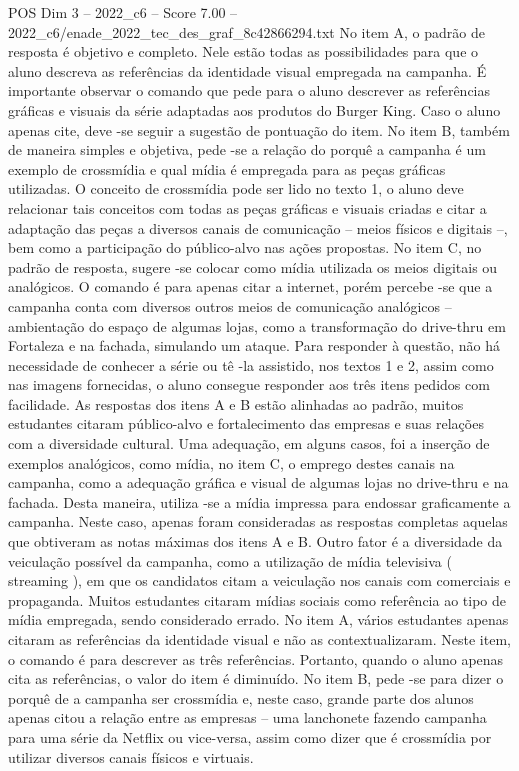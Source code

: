 \begin{textsample}{POS Dim 3 – 2022\_c6 – Score 7.00 – 2022\_c6/enade\_2022\_tec\_des\_graf\_8c42866294.txt}
No item A, o padrão de resposta é objetivo e completo.
Nele estão todas as possibilidades para que o aluno descreva as referências da identidade visual empregada na campanha.
É importante observar o comando que pede para o aluno descrever as referências gráficas e visuais da série adaptadas aos produtos do Burger King.
Caso o aluno apenas cite, deve -se seguir a sugestão de pontuação do item.
No item B, também de maneira simples e objetiva, pede -se a relação do porquê a campanha é um exemplo de crossmídia e qual mídia é empregada para as peças gráficas utilizadas.
O conceito de crossmídia pode ser lido no texto 1, o aluno deve relacionar tais conceitos com todas as peças gráficas e visuais criadas e citar a adaptação das peças a diversos canais de comunicação – meios físicos e digitais –, bem como a participação do público-alvo nas ações propostas.
No item C, no padrão de resposta, sugere -se colocar como mídia utilizada os meios digitais ou analógicos.
O comando é para apenas citar a internet, porém percebe -se que a campanha conta com diversos outros meios de comunicação analógicos – ambientação do espaço de algumas lojas, como a transformação do drive-thru em Fortaleza e na fachada, simulando um ataque.
Para responder à questão, não há necessidade de conhecer a série ou tê -la assistido, nos textos 1 e 2, assim como nas imagens fornecidas, o aluno consegue responder aos três itens pedidos com facilidade.
As respostas dos itens A e B estão alinhadas ao padrão, muitos estudantes citaram público-alvo e fortalecimento das empresas e suas relações com a diversidade cultural.
Uma adequação, em alguns casos, foi a inserção de exemplos analógicos, como mídia, no item C, o emprego destes canais na campanha, como a adequação gráfica e visual de algumas lojas no drive-thru e na fachada.
Desta maneira, utiliza -se a mídia impressa para endossar graficamente a campanha.
Neste caso, apenas foram consideradas as respostas completas aquelas que obtiveram as notas máximas dos itens A e B.
Outro fator é a diversidade da veiculação possível da campanha, como a utilização de mídia televisiva ( streaming ), em que os candidatos citam a veiculação nos canais com comerciais e propaganda.
Muitos estudantes citaram mídias sociais como referência ao tipo de mídia empregada, sendo considerado errado.
No item A, vários estudantes apenas citaram as referências da identidade visual e não as contextualizaram.
Neste item, o comando é para descrever as três referências.
Portanto, quando o aluno apenas cita as referências, o valor do item é diminuído.
No item B, pede -se para dizer o porquê de a campanha ser crossmídia e, neste caso, grande parte dos alunos apenas citou a relação entre as empresas – uma lanchonete fazendo campanha para uma série da Netflix ou vice-versa, assim como dizer que é crossmídia por utilizar diversos canais físicos e virtuais.

\end{textsample}
